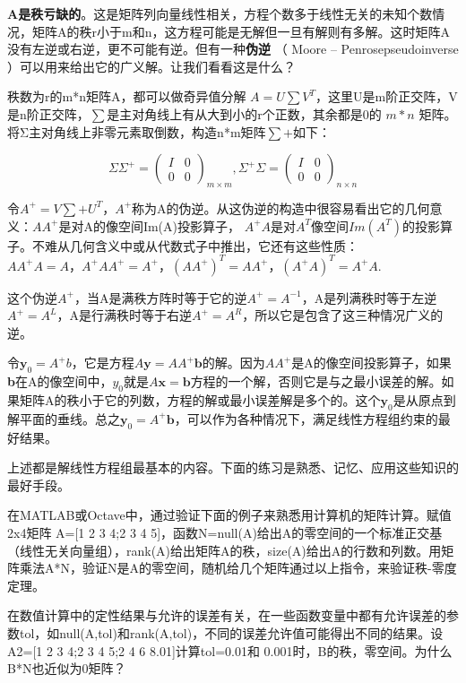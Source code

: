 \textbf{A是秩亏缺的}。这是矩阵列向量线性相关，方程个数多于线性无关的未知个数情况，矩阵A的秩r小于m和n，这方程可能是无解但一旦有解则有多解。这时矩阵A没有左逆或右逆，更不可能有逆。但有一种\textbf{伪逆} （ Moore – Penrosepseudoinverse ）可以用来给出它的广义解。让我们看看这是什么？

秩数为r的m*n矩阵A，都可以做奇异值分解 $ A= U\sum V^T $，这里U是m阶正交阵，V是n阶正交阵，$ \sum $是主对角线上有从大到小的r个正数，其余都是0的 $ m*n $ 矩阵。将Σ主对角线上非零元素取倒数，构造n*m矩阵$ \sum + $如下：

\[\Sigma \Sigma^+ = \begin{pmatrix}I&0\\0&0\end{pmatrix}_{m\times m},  \Sigma ^+\Sigma = \begin{pmatrix}I&0\\0&0\end{pmatrix}_{n\times n}\]

令$ A^+=V\sum+U^T $，$ A^+ $称为A的伪逆。从这伪逆的构造中很容易看出它的几何意义：$ AA^+ $是对A的像空间Im(A)投影算子， $ A^+A $是对$ A^T $像空间$ Im(A^T) $的投影算子。不难从几何含义中或从代数式子中推出，它还有这些性质：$ AA^+A=A，A^+AA^+=A^+，(AA^+)^T=AA^+，(A^+A)^T=A^+A $.

这个伪逆$ A^+ $，当A是满秩方阵时等于它的逆$ A^+=A^{-1} $，A是列满秩时等于左逆$ A^+=A^L $，A是行满秩时等于右逆$ A^+=A^R $，所以它是包含了这三种情况广义的逆。

令$ \mathbf{y}_0=A^+b $，它是方程$ A\mathbf{y}=AA^+\mathbf{b} $的解。因为$ AA^+ $是A的像空间投影算子，如果\textbf{b}在A的像空间中，$ y_0 $就是$ A\mathbf{x}=\mathbf{b} $方程的一个解，否则它是与之最小误差的解。如果矩阵A的秩小于它的列数，方程的解或最小误差解是多个的。这个$ \mathbf{y}_0 $是从原点到解平面的垂线。总之$ \mathbf{y}_0=A^+\mathbf{b} $，可以作为各种情况下，满足线性方程组约束的最好结果。

上述都是解线性方程组最基本的内容。下面的练习是熟悉、记忆、应用这些知识的最好手段。

\kaishu

在MATLAB或Octave中，通过验证下面的例子来熟悉用计算机的矩阵计算。赋值2x4矩阵 A=[1 2 3 4;2 3 4 5]，函数N=null(A)给出A的零空间的一个标准正交基（线性无关向量组），rank(A)给出矩阵A的秩，size(A)给出A的行数和列数。用矩阵乘法A*N，验证N是A的零空间，随机给几个矩阵通过以上指令，来验证秩-零度定理。

在数值计算中的定性结果与允许的误差有关，在一些函数变量中都有允许误差的参数tol，如null(A,tol)和rank(A,tol)，不同的误差允许值可能得出不同的结果。设A2=[1 2 3 4;2 3 4 5;2 4 6 8.01]计算tol=0.01和 0.001时，B的秩，零空间。为什么B*N也近似为0矩阵？

